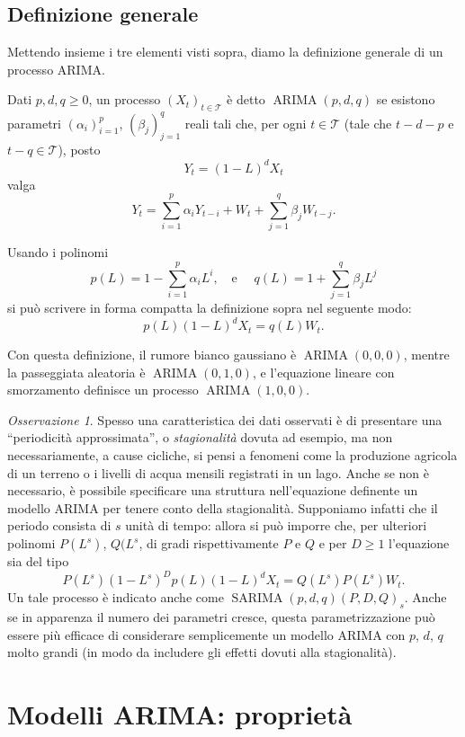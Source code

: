 \documentclass[
  italian,
  letterpaper,
]{book}
\theoremstyle{definition}
\theoremstyle{remark}
\newtheorem*{remark}{Osservazione}
\begin{document}
\subsection{Definizione generale}\label{definizione-generale}

Mettendo insieme i tre elementi visti sopra, diamo la definizione
generale di un processo ARIMA.

Dati \(p, d, q \ge 0\), un processo \((X_t)_{t \in \mathcal{T}}\) è
detto \(\operatorname{ARIMA}(p,d,q)\) se esistono parametri
\((\alpha_i)_{i=1}^p\), \((\beta_j)_{j=1}^q\) reali tali che, per ogni
\(t \in \mathcal{T}\) (tale che \(t-d-p\) e \(t-q \in \mathcal{T}\)),
posto \[ Y_t  = (1-L)^d X_t\] valga
\[ Y_t = \sum_{i=1}^p \alpha_i Y_{t-i} + W_t + \sum_{j=1}^q  \beta_j W_{t-j}.\]

Usando i polinomi
\[ p(L) = 1- \sum_{i=1}^ p \alpha_i L^i, \quad \text{e } \quad q(L) = 1+ \sum_{j=1}^q \beta_j L^j\]
si può scrivere in forma compatta la definizione sopra nel seguente
modo: \[ p(L)(1-L)^d X_t = q(L)W_t.\]

Con questa definizione, il rumore bianco gaussiano è
\(\operatorname{ARIMA}(0,0,0)\), mentre la passeggiata aleatoria è
\(\operatorname{ARIMA}(0,1,0)\), e l'equazione lineare con smorzamento
definisce un processo \(\operatorname{ARIMA}(1,0,0)\).

\begin{remark}
Spesso una caratteristica dei dati osservati è di presentare una
``periodicità approssimata'', o \emph{stagionalità} dovuta ad esempio,
ma non necessariamente, a cause cicliche, si pensi a fenomeni come la
produzione agricola di un terreno o i livelli di acqua mensili
registrati in un lago. Anche se non è necessario, è possibile
specificare una struttura nell'equazione definente un modello ARIMA per
tenere conto della stagionalità. Supponiamo infatti che il periodo
consista di \(s\) unità di tempo: allora si può imporre che, per
ulteriori polinomi \(P(L^s)\), \(Q(L^s\), di gradi rispettivamente \(P\)
e \(Q\) e per \(D \ge 1\) l'equazione sia del tipo
\[  P(L^s) (1-L^s)^D p(L)(1-L)^d X_ t = Q(L^s) P(L^s) W_t. \] Un tale
processo è indicato anche come
\(\operatorname{SARIMA}(p,d,q)(P,D,Q)_s\). Anche se in apparenza il
numero dei parametri cresce, questa parametrizzazione può essere più
efficace di considerare semplicemente un modello ARIMA con \(p\), \(d\),
\(q\) molto grandi (in modo da includere gli effetti dovuti alla
stagionalità).
\end{remark}

\section{Modelli ARIMA: proprietà}\label{sec-arima-prop}
\end{document}
